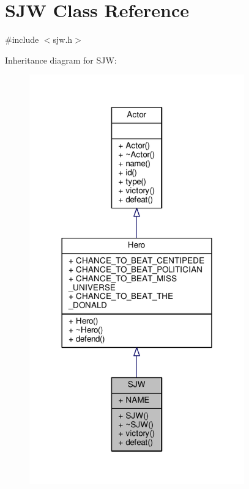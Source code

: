 \hypertarget{classSJW}{}\section{S\+JW Class Reference}
\label{classSJW}


{\ttfamily \#include $<$sjw.\+h$>$}



Inheritance diagram for S\+JW\+:
\nopagebreak
\begin{figure}[H]
\begin{center}
\leavevmode
\includegraphics[width=263pt]{classSJW__inherit__graph}
\end{center}
\end{figure}


